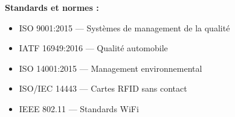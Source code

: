 \textbf{Standards et normes :}
\begin{itemize}
    \item ISO 9001:2015 --- Systèmes de management de la qualité
    \item IATF 16949:2016 --- Qualité automobile
    \item ISO 14001:2015 --- Management environnemental
    \item ISO/IEC 14443 --- Cartes RFID sans contact
    \item IEEE 802.11 --- Standards WiFi
\end{itemize}

\clearpage

